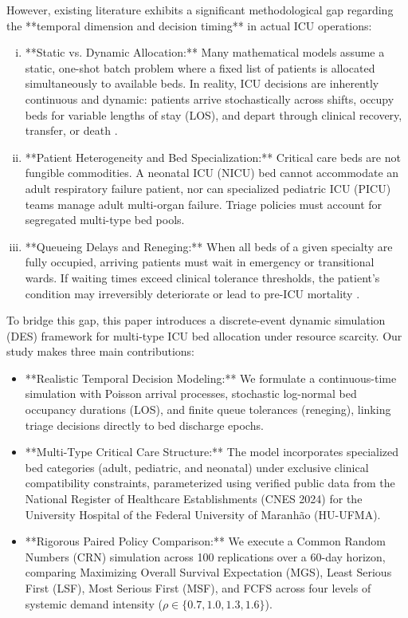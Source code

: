 \documentclass{ro}
\begin{document}
However, existing literature exhibits a significant methodological gap regarding the **temporal dimension and decision timing** in actual ICU operations:
\begin{enumerate}[(i)]
    \item **Static vs. Dynamic Allocation:** Many mathematical models assume a static, one-shot batch problem where a fixed list of patients is allocated simultaneously to available beds. In reality, ICU decisions are inherently continuous and dynamic: patients arrive stochastically across shifts, occupy beds for variable lengths of stay (LOS), and depart through clinical recovery, transfer, or death \cite{Bilbao_2022, Valeva_2023}.
    \item **Patient Heterogeneity and Bed Specialization:** Critical care beds are not fungible commodities. A neonatal ICU (NICU) bed cannot accommodate an adult respiratory failure patient, nor can specialized pediatric ICU (PICU) teams manage adult multi-organ failure. Triage policies must account for segregated multi-type bed pools.
    \item **Queueing Delays and Reneging:** When all beds of a given specialty are fully occupied, arriving patients must wait in emergency or transitional wards. If waiting times exceed clinical tolerance thresholds, the patient's condition may irreversibly deteriorate or lead to pre-ICU mortality \cite{king2019modelling, Murray_2023}.
\end{enumerate}

To bridge this gap, this paper introduces a discrete-event dynamic simulation (DES) framework for multi-type ICU bed allocation under resource scarcity. Our study makes three main contributions:
\begin{itemize}
    \item **Realistic Temporal Decision Modeling:** We formulate a continuous-time simulation with Poisson arrival processes, stochastic log-normal bed occupancy durations (LOS), and finite queue tolerances (reneging), linking triage decisions directly to bed discharge epochs.
    \item **Multi-Type Critical Care Structure:** The model incorporates specialized bed categories (adult, pediatric, and neonatal) under exclusive clinical compatibility constraints, parameterized using verified public data from the National Register of Healthcare Establishments (CNES 2024) for the University Hospital of the Federal University of Maranh\~ao (HU-UFMA).
    \item **Rigorous Paired Policy Comparison:** We execute a Common Random Numbers (CRN) simulation across 100 replications over a 60-day horizon, comparing Maximizing Overall Survival Expectation (MGS), Least Serious First (LSF), Most Serious First (MSF), and FCFS across four levels of systemic demand intensity ($\rho \in \{0.7, 1.0, 1.3, 1.6\}$).
\end{itemize}
\end{document}
